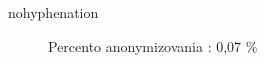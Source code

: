 \begin{hyphenrules}{nohyphenation}
\begin{figure}[H]
\begin{minipage}[t]{.5\linewidth}
\caption{Percento anonymizovania : 0,07 \%}
\label{fig:5.5} 
\end{minipage}\hfill
\begin{minipage}[b]{.5\linewidth}

\end{minipage}
\end{figure}
\end{hyphenrules}
